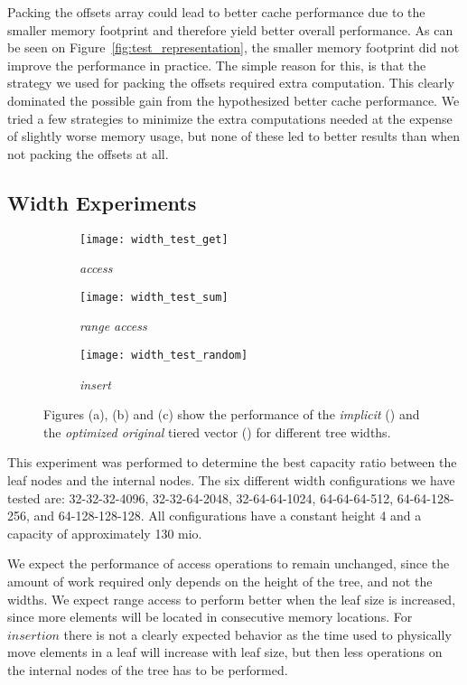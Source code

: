 Packing the offsets array could lead to 
better cache performance due to the smaller memory footprint and therefore
yield better overall performance.
As can be seen on Figure~\ref{fig:test_representation},
the smaller memory footprint
did not improve the performance in practice.
The simple reason for this,
is that the strategy we used for packing the offsets required
extra computation. This clearly dominated the possible gain from the
hypothesized better cache performance. We tried a few strategies to minimize
the extra computations needed at the expense of slightly worse memory usage,
but none of these led to better results than when not packing the offsets at
all.

\subsection{Width Experiments}

\begin{figure}
	\centering
	\begin{subfigure}[b]{0.3\textwidth}
		\texttt{[image: width\_test\_get]}
		\caption{\textit{access}}
	\end{subfigure}
	\begin{subfigure}[b]{0.3\textwidth}
		\texttt{[image: width\_test\_sum]}
		\caption{\textit{range access}}
	\end{subfigure}
	\begin{subfigure}[b]{0.3\textwidth}
		\texttt{[image: width\_test\_random]}
		\caption{\textit{insert}}
	\end{subfigure}
	\caption{Figures (a), (b) and (c) show the performance of the \textit{implicit} (\protect\purple) and
		the \textit{optimized original} tiered vector (\protect\green) for different tree widths.}
\label{fig:test_width}
\end{figure}

This experiment was performed to determine the best capacity ratio between the leaf nodes and the internal nodes.
The six different width configurations we have tested are: 32-32-32-4096, 32-32-64-2048, 32-64-64-1024, 64-64-64-512, 64-64-128-256, and 64-128-128-128.
All configurations have a constant height 4 and a capacity of approximately 130 mio.

We expect the performance of access operations to remain unchanged, since the
amount of work required only depends on the height of the tree,
and not the widths. We expect range access to perform better when the leaf size
is increased, since more elements will be located in consecutive memory
locations. For $insertion$ there is not a clearly expected behavior as the time
used to physically move elements in a leaf will increase with leaf size, but
then less operations on the internal nodes of the tree has to be performed.

